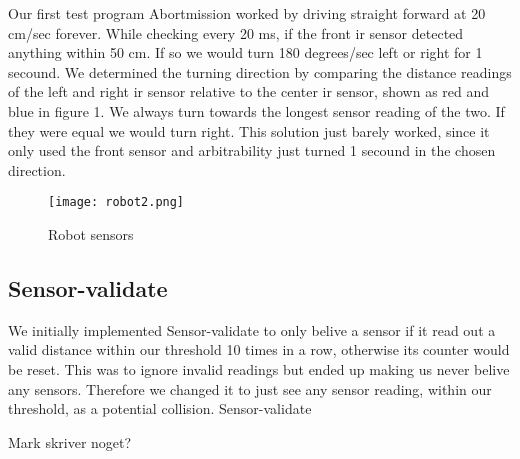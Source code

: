 \documentclass[a4paper,12pt]{article}
\begin{document}
Our first test program Abortmission worked by driving straight forward at 20 cm/sec forever. While checking every 20 ms, if the front ir sensor detected anything within 50 cm. If so we would turn 180 degrees/sec left or right for 1 secound. We determined the turning direction by comparing the distance readings of the left and right ir sensor relative to the center ir sensor, shown as red and blue in figure 1. We always turn towards the longest sensor reading of the two. If they were equal we would turn right.
\newline
\newline
This solution just barely worked, since it only used the front sensor and arbitrability just turned 1 secound in the chosen direction.

\begin{figure}
\texttt{[image: robot2.png]}
\caption{Robot sensors}
\end{figure}

\subsection{Sensor-validate}

We initially implemented Sensor-validate to only belive a sensor if it read out a valid distance within our threshold 10 times in a row, otherwise its counter would be reset. This was to ignore invalid readings but ended up making us never belive any sensors. Therefore we changed it to just see any sensor reading, within our threshold, as a potential collision.
\newline
\newline
Sensor-validate

Mark skriver noget?
\end{document}
